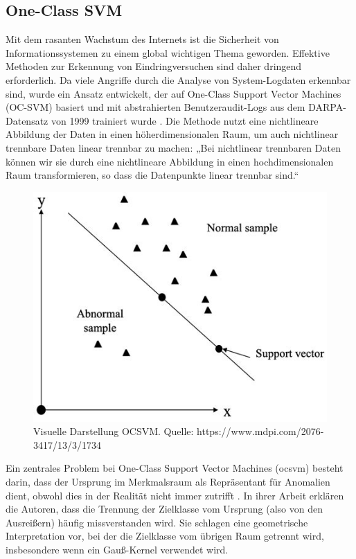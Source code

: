 \documentclass[a4paper,12pt]{article}
\begin{document}
	\subsection{One-Class SVM}
	Mit dem rasanten Wachstum des Internets ist die Sicherheit von Informationssystemen zu einem global wichtigen Thema geworden. Effektive Methoden zur Erkennung von Eindringversuchen sind daher dringend erforderlich. Da viele Angriffe durch die Analyse von System-Logdaten erkennbar sind, wurde ein Ansatz entwickelt, der auf One-Class Support Vector Machines (OC-SVM) basiert und mit abstrahierten Benutzeraudit-Logs aus dem DARPA-Datensatz von 1999 trainiert wurde \cite{li2003improving}. Die Methode nutzt eine nichtlineare Abbildung der Daten in einen höherdimensionalen Raum, um auch nichtlinear trennbare Daten linear trennbar zu machen:
	„Bei nichtlinear trennbaren Daten können wir sie durch eine nichtlineare Abbildung in einen hochdimensionalen Raum transformieren, so dass die Datenpunkte linear trennbar sind.“
	\\[0.5em]
	\begin{figure}
		\centering
		\includegraphics[width=0.7\linewidth]{screenshot006}
		\caption{Visuelle Darstellung  OCSVM. Quelle: https://www.mdpi.com/2076-3417/13/3/1734}
		\label{fig:screenshot006}
	\end{figure}
	Ein zentrales Problem bei One-Class Support Vector Machines (\gls{ocsvm}) besteht darin, dass der Ursprung im Merkmalsraum als Repräsentant für Anomalien dient, obwohl dies in der Realität nicht immer zutrifft \cite{bounsiar2025oneclass}. In ihrer Arbeit erklären die Autoren, dass die Trennung der Zielklasse vom Ursprung (also von den Ausreißern) häufig missverstanden wird. Sie schlagen eine geometrische Interpretation vor, bei der die Zielklasse vom übrigen Raum getrennt wird, insbesondere wenn ein Gauß-Kernel verwendet wird.
	
\end{document}
